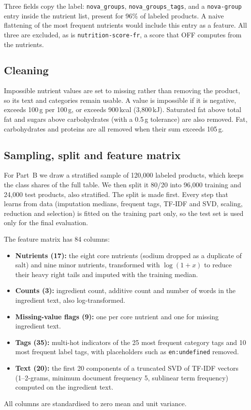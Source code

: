 \documentclass[conference]{IEEEtran}
\begin{document}
Three fields copy the label: \texttt{nova\_groups}, \texttt{nova\_groups\_tags}, and a \texttt{nova-group} entry inside the nutrient list, present for 96\% of labeled products. A naive flattening of the most frequent nutrients would include this entry as a feature. All three are excluded, as is \texttt{nutrition-score-fr}, a score that OFF computes from the nutrients.

\subsection{Cleaning}
Impossible nutrient values are set to missing rather than removing the product, so its text and categories remain usable. A value is impossible if it is negative, exceeds 100\,g per 100\,g, or exceeds 900\,kcal (3,800\,kJ). Saturated fat above total fat and sugars above carbohydrates (with a 0.5\,g tolerance) are also removed. Fat, carbohydrates and proteins are all removed when their sum exceeds 105\,g.

\subsection{Sampling, split and feature matrix}
For Part~B we draw a stratified sample of 120,000 labeled products, which keeps the class shares of the full table. We then split it 80/20 into 96,000 training and 24,000 test products, also stratified. The split is made first. Every step that learns from data (imputation medians, frequent tags, TF-IDF and SVD, scaling, reduction and selection) is fitted on the training part only, so the test set is used only for the final evaluation.

The feature matrix has 84 columns:
\begin{itemize}
    \item \textbf{Nutrients (17):} the eight core nutrients (sodium dropped as a duplicate of salt) and nine minor nutrients, transformed with $\log(1+x)$ to reduce their heavy right tails and imputed with the training median.
    \item \textbf{Counts (3):} ingredient count, additive count and number of words in the ingredient text, also log-transformed.
    \item \textbf{Missing-value flags (9):} one per core nutrient and one for missing ingredient text.
    \item \textbf{Tags (35):} multi-hot indicators of the 25 most frequent category tags and 10 most frequent label tags, with placeholders such as \texttt{en:undefined} removed.
    \item \textbf{Text (20):} the first 20 components of a truncated SVD of TF-IDF vectors (1--2-grams, minimum document frequency 5, sublinear term frequency) computed on the ingredient text.
\end{itemize}
All columns are standardised to zero mean and unit variance.
\end{document}
